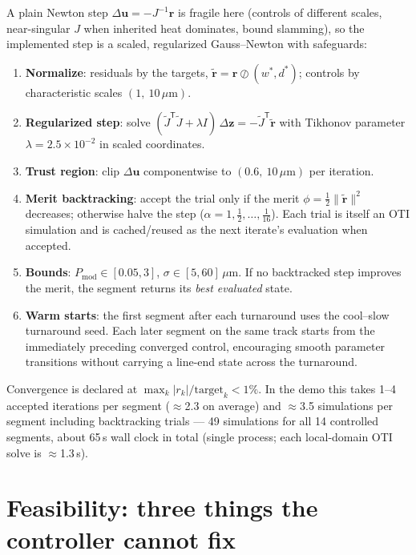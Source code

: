 \documentclass[11pt]{article}
\newcommand{\Pmod}{P_{\mathrm{mod}}}
\begin{document}
A plain Newton step $\Delta\mathbf{u} = -J^{-1}\mathbf{r}$ is fragile here
(controls of different scales, near-singular $J$ when inherited heat
dominates, bound slamming), so the implemented step is a scaled, regularized
Gauss--Newton with safeguards:
\begin{enumerate}
  \item \textbf{Normalize}: residuals by the targets,
        $\tilde{\mathbf r} = \mathbf r \oslash (w^\ast, d^\ast)$; controls by
        characteristic scales $(1,\ 10\,\mu\mathrm{m})$.
  \item \textbf{Regularized step}: solve
        $(\tilde J^{\mathsf T}\tilde J + \lambda I)\,\Delta\mathbf{z}
         = -\tilde J^{\mathsf T}\tilde{\mathbf r}$ with Tikhonov parameter
        $\lambda = 2.5\times10^{-2}$ in scaled coordinates.
  \item \textbf{Trust region}: clip $\Delta\mathbf u$ componentwise to
        $(0.6,\ 10\,\mu\mathrm{m})$ per iteration.
  \item \textbf{Merit backtracking}: accept the trial only if the merit
        $\phi = \tfrac12\|\tilde{\mathbf r}\|^2$ decreases; otherwise halve
        the step ($\alpha = 1, \tfrac12, \ldots, \tfrac1{16}$). Each trial is
        itself an OTI simulation and is cached/reused as the next iterate's
        evaluation when accepted.
  \item \textbf{Bounds}: $\Pmod{} \in [0.05, 3]$,
        $\sigma \in [5, 60]\,\mu\mathrm{m}$. If no backtracked step improves
        the merit, the segment returns its \emph{best evaluated} state.
  \item \textbf{Warm starts}: the first segment after each turnaround uses
        the cool--slow turnaround seed. Each later segment on the same track
        starts from the immediately preceding converged control, encouraging
        smooth parameter transitions without carrying a line-end state across
        the turnaround.
\end{enumerate}
Convergence is declared at $\max_k |r_k|/\text{target}_k < 1\%$. In the demo
this takes 1--4 accepted iterations per segment ($\approx$2.3 on average) and
$\approx$3.5 simulations per segment including backtracking trials --- 49
simulations for all 14 controlled segments, about 65\,s wall clock in total
(single process; each local-domain OTI solve is $\approx$1.3\,s).

\section{Feasibility: three things the controller cannot fix}
\label{sec:feasibility}
\end{document}
